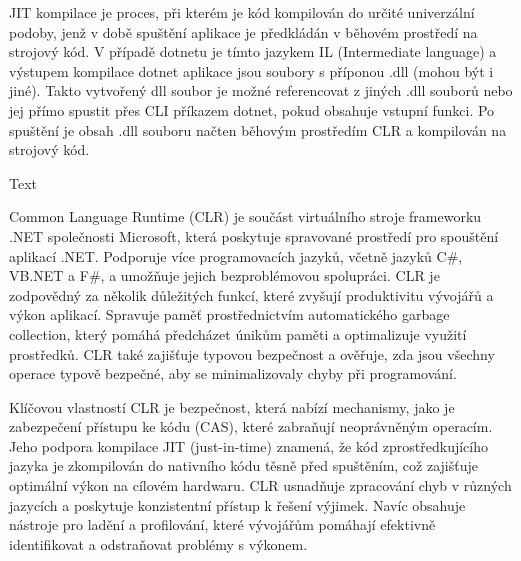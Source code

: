 JIT kompilace je proces, při kterém je kód kompilován do určité univerzální podoby, jenž v době spuštění aplikace je předkládán v běhovém prostředí na strojový kód. V případě dotnetu je tímto jazykem IL (Intermediate language) a výstupem kompilace dotnet aplikace jsou soubory s příponou .dll (mohou být i jiné). Takto vytvořený dll soubor je možné referencovat z jiných .dll souborů nebo jej přímo spustit přes CLI příkazem dotnet, pokud obsahuje vstupní funkci. Po spuštění je obsah .dll souboru načten běhovým prostředím CLR a kompilován na strojový kód.\cite{jit}

Text


Common Language Runtime (CLR) je součást virtuálního stroje frameworku .NET společnosti Microsoft, která poskytuje spravované prostředí pro spouštění aplikací .NET. Podporuje více programovacích jazyků, včetně jazyků C\#, VB.NET a F\#, a umožňuje jejich bezproblémovou spolupráci. CLR je zodpovědný za několik důležitých funkcí, které zvyšují produktivitu vývojářů a výkon aplikací. Spravuje paměť prostřednictvím automatického garbage collection, který pomáhá předcházet únikům paměti a optimalizuje využití prostředků. CLR také zajišťuje typovou bezpečnost a ověřuje, zda jsou všechny operace typově bezpečné, aby se minimalizovaly chyby při programování.

Klíčovou vlastností CLR je bezpečnost, která nabízí mechanismy, jako je zabezpečení přístupu ke kódu (CAS), které zabraňují neoprávněným operacím. Jeho podpora kompilace JIT (just-in-time) znamená, že kód zprostředkujícího jazyka je zkompilován do nativního kódu těsně před spuštěním, což zajišťuje optimální výkon na cílovém hardwaru. CLR usnadňuje zpracování chyb v různých jazycích a poskytuje konzistentní přístup k řešení výjimek. Navíc obsahuje nástroje pro ladění a profilování, které vývojářům pomáhají efektivně identifikovat a odstraňovat problémy s výkonem.


